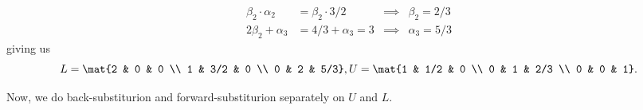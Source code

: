\documentclass{article}
\begin{document}
\begin{enumerate}
{\begin{displaymath}
\begin{aligned}
                    \beta_2 \cdot \alpha_2 &= \beta_2 \cdot 3/2
                    &\implies& \beta_2 = 2/3 \\
                    2\beta_2 + \alpha_3 &= 4/3 + \alpha_3 = 3
                    &\implies& \alpha_3 = 5/3
                \end{aligned}
            \end{displaymath}
            giving us
            \begin{displaymath}
                L = \mat{2 & 0 & 0 \\ 1 & 3/2 & 0 \\ 0 & 2 & 5/3},
                U = \mat{1 & 1/2 & 0 \\ 0 & 1 & 2/3 \\ 0 & 0 & 1}.
            \end{displaymath}

            Now, we do back-substiturion and forward-substiturion separately on \(U\) and \(L\).

}
\end{enumerate}
\end{document}
